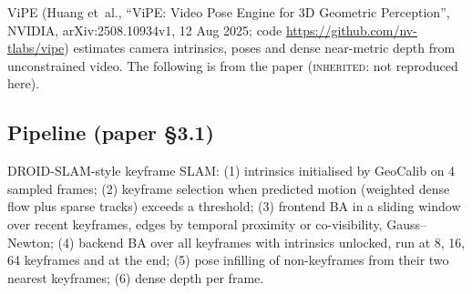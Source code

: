 \documentclass[10pt,a4paper]{article}
\newcommand{\inh}{\textsc{inherited}}
\begin{document}
ViPE (Huang et~al., ``ViPE: Video Pose Engine for 3D Geometric Perception'', NVIDIA, arXiv:2508.10934v1,
12 Aug 2025; code \url{https://github.com/nv-tlabs/vipe}) estimates camera intrinsics, poses and dense
near-metric depth from unconstrained video. The following is from the paper (\inh{}: not reproduced here).

\subsection{Pipeline (paper \S3.1)}
DROID-SLAM-style keyframe SLAM: (1) intrinsics initialised by GeoCalib on 4 sampled frames;
(2) keyframe selection when predicted motion (weighted dense flow plus sparse tracks) exceeds a threshold;
(3) frontend BA in a sliding window over recent keyframes, edges by temporal proximity or co-visibility,
Gauss--Newton; (4) backend BA over all keyframes with intrinsics unlocked, run at 8, 16, 64 keyframes and at
the end; (5) pose infilling of non-keyframes from their two nearest keyframes; (6) dense depth per frame.
\end{document}
